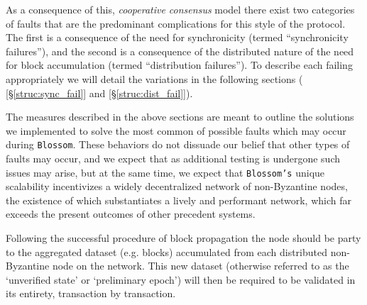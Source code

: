 As a consequence of this, \textit{cooperative consensus} model there exist two categories of faults that are the predominant complications for this style of the protocol. The first is a consequence of the need for synchronicity (termed “synchronicity failures”), and the second is a consequence of the distributed nature of the need for block accumulation (termed “distribution failures”). To describe each failing appropriately we will detail the variations in the following sections (\textit{} [\S\ref{struc:sync_fail}] and \textit{} [\S\ref{struc:dist_fail}]).

The measures described in the above sections are meant to outline the solutions we implemented to solve the most common of possible faults which may occur during \texttt{Blossom}. These behaviors do not dissuade our belief that other types of faults may occur, and we expect that as additional testing is undergone such issues may arise, but at the same time, we expect that \texttt{Blossom's} unique scalability incentivizes a widely decentralized network of non-Byzantine nodes, the existence of which substantiates a lively and performant network, which far exceeds the present outcomes of other precedent systems.

Following the successful procedure of block propagation the node should be party to the aggregated dataset (e.g. blocks) accumulated from each distributed non-Byzantine node on the network. This new dataset (otherwise referred to as the ‘unverified state’ or ‘preliminary epoch’) will then be required to be validated in its entirety, transaction by transaction.

